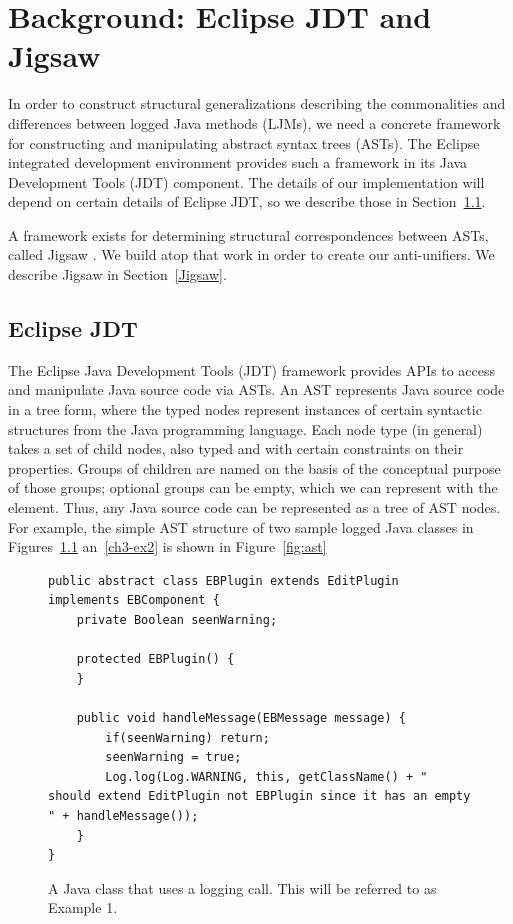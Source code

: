 \chapter{Background: Eclipse JDT and Jigsaw}\label{background2}

In order to construct structural generalizations describing the commonalities and differences between logged Java methods (LJMs), we need a concrete framework for constructing and manipulating abstract syntax trees (ASTs).  The Eclipse integrated development environment provides such a framework in its Java Development Tools (JDT) component.  The details of our implementation will depend on certain details of Eclipse JDT, so we describe those in Section~\ref{JDT}.

A framework exists for determining structural correspondences between ASTs, called Jigsaw \cite{2008:fse:cottrell}.  We build atop that work in order to create our anti-unifiers. We describe Jigsaw in Section~\ref{Jigsaw}.

\section{Eclipse JDT}\label{JDT}

The Eclipse Java Development Tools (JDT) framework provides APIs to access and manipulate Java source code via ASTs. An AST represents Java source code in a tree form, where the typed nodes represent instances of certain syntactic structures from the Java programming language.  Each node type (in general) takes a set of child nodes, also typed and with certain constraints on their properties.  Groups of children are named on the basis of the conceptual purpose of those groups; optional groups can be empty, which we can represent with the \NIL{} element. Thus, any Java source code can be represented as a tree of AST nodes. For example, the simple AST structure of two sample logged Java classes in Figures~\ref{ch3-ex1} an~\ref{ch3-ex2} is shown in Figure~\ref{fig:ast}

\begin{figure}[p]
\def\baselinestretch{1}
\begin{lstlisting}
public abstract class EBPlugin extends EditPlugin implements EBComponent {
    private Boolean seenWarning;

    protected EBPlugin() {
    }

    public void handleMessage(EBMessage message) {
        if(seenWarning) return;
        seenWarning = true;
        Log.log(Log.WARNING, this, getClassName() + " should extend EditPlugin not EBPlugin since it has an empty " + handleMessage());
    }
}
\end{lstlisting}
\caption{A Java class that uses a logging call. This will be referred to as Example 1.\label{ch3-ex1}}
\end{figure}

